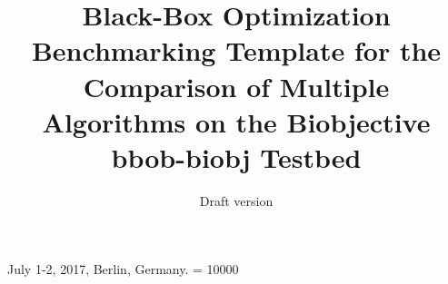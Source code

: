 \documentclass{sig-alternate}
\newcommand{\bbobbiobj}{{\ttfamily bbob-biobj}\xspace}
\begin{document}
%
 {July 1-2, 2017, Berlin, Germany.}
\widowpenalty = 10000

\title{Black-Box Optimization Benchmarking Template for the Comparison of Multiple Algorithms on the Biobjective {\Large \bbobbiobj} Testbed}
\subtitle{Draft version
}

%
%
%
%
%
\end{document}
